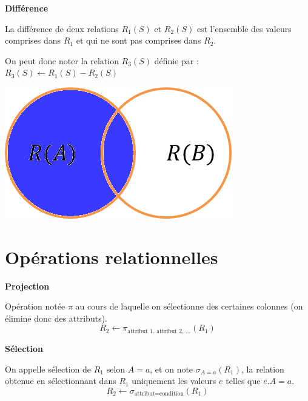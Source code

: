 \documentclass[10pt]{article}
\begin{document}
\begin{defi}
\begin{minipage}[c]{.75\linewidth}
\textbf{Différence}

La différence de deux relations $R_1(S)$ et $R_2(S)$ est l'ensemble des valeurs comprises dans $R_1$ et qui ne sont pas comprises dans $R_2$. 

On peut donc noter la relation $R_3(S)$ définie par : $R_3(S)\leftarrow R_1(S)-R_2(S)$
\end{minipage}\hfill
\begin{minipage}[c]{.2\linewidth}
\begin{center}
\includegraphics[width=.95\textwidth]{images/diff}
\end{center}
\end{minipage}
\end{defi}


\section{Opérations relationnelles}

\begin{defi}

\textbf{Projection}

Opération notée $\pi$ au cours de laquelle on sélectionne des certaines colonnes (on élimine donc des attributs). 
 $$
 R_2 \leftarrow \pi_{\text{attribut 1, attribut 2, ...}}(R_1)
 $$

\end{defi}


\begin{defi}
\textbf{Sélection}

On appelle sélection de $R_1$ selon $A=a$, et on note $\sigma_{A=a}(R_1)$, la relation obtenue en sélectionnant dans $R_1$ uniquement les valeurs $e$ telles que $e.A = a$.
$$
R_2 \leftarrow \sigma_{\text{attribut}=\text{condition}}(R_1)
$$
\end{defi}
\end{document}
